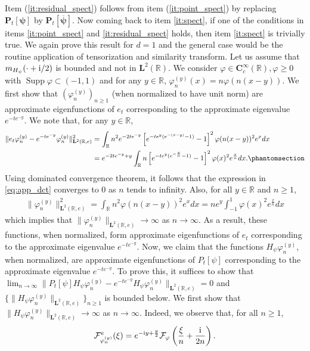 \documentclass[12pt]{amsart}
\newcommand{\hlabel}{\phantomsection\label}
\newcommand{\hptg}[2]{\hypertarget{#1}{#2}}
\numberwithin{equation}{section}
\newcommand{\bb}{\mathbb}
\newcommand{\cc}{\mathcal}
\renewcommand{\ge}{\geqslant}
\newcommand{\hpt}[2]{#2}
\newcommand{\supp}{\operatorname{Supp}}
\newcommand{\ov}{\overline}
\newcommand{\bmrm}[2][2]{\mathbf{#2}^{#1}}
\newcommand{\fou}{\mathcal{F}}
\newcommand{\phin}{\varphi^{(y)}_n}
\newcommand{\Hpsi}{H_\psi}
\newcommand{\mpsi}{m_{\Hpsi}}
\newcommand{\fouho}{\cc{F}^{e}}
\newcommand{\C}{\mathbf{C}}
\newcommand{\LRe}{\bmrm{L}(\bb{R},e)}
\theoremstyle{definition}
\theoremstyle{assump}
\theoremstyle{remark}
\begin{document}
{Item (\ref{it:residual_spect}) follows from item (\ref{it:point_spect}) by replacing $\bm{P}_t[\bm{\psi}]$ by $\bm{P}_t[\ov{\bm{\psi}}]$. Now coming back to item \eqref{it:spect}, if one of the conditions in items \eqref{it:point_spect} and \eqref{it:residual_spect} holds, then item \eqref{it:spect} is trivially true. We again prove this result for $d=1$ and the general case would be the routine application of tensorization and similarity transform. Let us assume that $\mpsi(\cdot+{\rm{i}}/2)$ is bounded and not in $\bmrm{L}(\bb{R})$. We consider $\varphi\in \C^\infty_c(\bb{R}), \varphi\ge 0$ with $\supp\varphi\subset (-1,1)$ and for any $y\in\bb{R}$, \hpt{R32}{$\varphi^{(y)}_n(x)={n}\varphi(n(x-y))$}. We first show that $(\varphi^{(y)}_n)_{n\ge 1}$ (when normalized to have unit norm) are approximate eigenfunctions of $e_t$ corresponding to the approximate eigenvalue $e^{-te^{-y}}$. We note that, for any $y\in\bb{R}$,
\begin{align}
\|e_t\phin-e^{-te^{-y}}\phin\|^2_{\bmrm{L}(\bb{R},e)} \nonumber
&=\int_{\bb{R}}n^2e^{-2te^{-y}}\left[e^{-te^y(e^{-(x-y)}-1)}-1\right]^2\varphi(n(x-y))^2e^xdx \nonumber \\
&=e^{-2te^{-y}+y}\int_{\bb{R}}n\left[e^{-te^y(e^{-\frac{x}{n}}-1)}-1\right]^2\varphi(x)^2e^{\frac{x}{n}}dx. \hlabel{eq:app_dct}
\end{align}
Using dominated convergence theorem, it follows that the expression in \eqref{eq:app_dct} converges to $0$ as $n$ tends to infinity.  Also, for all $y\in\bb R$ and $n\ge 1$,
\begin{align*}
\|\varphi^{(y)}_n\|^2_{\LRe}=\int_{\bb R} n^2\varphi(n(x-y))^2 e^{x} dx=ne^y\int_{-1}^1 \varphi(x)^2 e^{\frac{x}{n}}dx
\end{align*}
which implies that $\|\varphi^{(y)}_n\|_{\bmrm{L}(\bb R,e)}\to\infty$ as $n\to\infty$. As a result, these functions, when normalized, form approximate eigenfunctions of $e_t$ corresponding to the approximate eigenvalue $e^{-te^{-y}}$. Now, we claim that the functions $\Hpsi\phin$, when normalized, are approximate eigenfunctions of $P_t[\psi]$ corresponding to the approximate eigenvalue $e^{-te^{-y}}$. \hptg{C81}{To prove this, it suffices to show that} \hpt{R31}{$\lim_{n\to\infty}\|P_t[\psi]\Hpsi\phin-e^{-te^{-y}}\Hpsi\phin\|_{\LRe}=0$} and $\{\|\Hpsi\phin\|_{\LRe}\}_{n\ge 1}$ is bounded below.  We first show that $\|\Hpsi\phin\|_{\bmrm{L}(\bb{R},e)}\to\infty$ as $n\to\infty$. Indeed, we observe that, for all $n\ge 1$,
\begin{align*}
\fouho_{\phin}(\xi)=e^{-\mathrm{i}y+\frac{y}{2}}\fou_\varphi\left(\frac{\xi}{n}+\frac{{\rm{i}}}{2n}\right).

\end{align*}}
\end{document}

